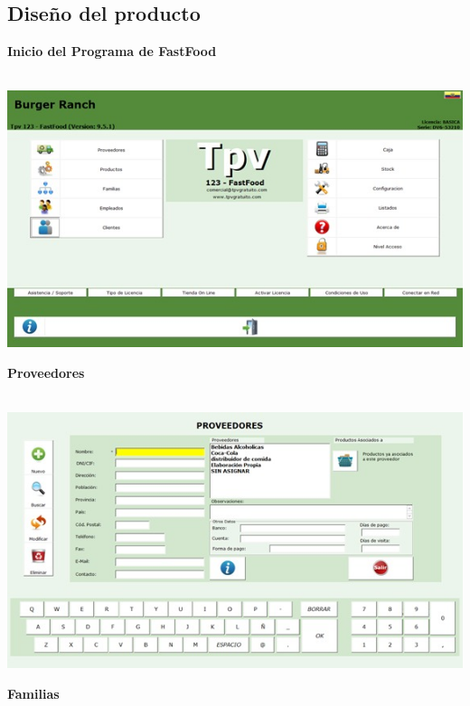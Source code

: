 \documentclass[12pt,a4paper]{article}
\begin{document}
\subsection{Diseño del producto}
\par\vspace{0.5cm}
\textbf {Inicio del Programa de FastFood}\\\\
\begin{center}
\includegraphics[scale=0.7]{1.jpg}
\end{center}
\par\vspace{6cm}
\textbf {Proveedores}\\\\
\begin{center}
 \includegraphics[scale=0.7]{2.jpg}
 \end{center} 
 \par\vspace{0.5cm}
\textbf {Familias}\\\\
\end{document}
